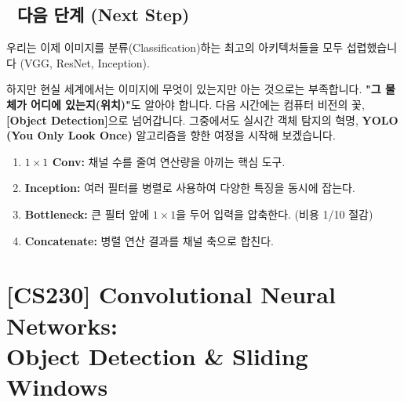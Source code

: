 \documentclass[11pt,a4paper]{book}
\theoremstyle{definition}
\begin{document}
\section*{🔗 다음 단계 (Next Step)}
우리는 이제 이미지를 분류(Classification)하는 최고의 아키텍처들을 모두 섭렵했습니다 (VGG, ResNet, Inception).

하지만 현실 세계에서는 이미지에 무엇이 있는지만 아는 것으로는 부족합니다. \textbf{"그 물체가 어디에 있는지(위치)"}도 알아야 합니다.
다음 시간에는 컴퓨터 비전의 꽃, \textbf{[Object Detection]}으로 넘어갑니다. 그중에서도 실시간 객체 탐지의 혁명, \textbf{YOLO (You Only Look Once)} 알고리즘을 향한 여정을 시작해 보겠습니다.

\vspace{0.5cm}

\begin{summarybox}[title={단원 요약 (Cheat Sheet)}]
\begin{enumerate}
    \item \textbf{$1 \times 1$ Conv:} 채널 수를 줄여 연산량을 아끼는 핵심 도구.
    \item \textbf{Inception:} 여러 필터를 병렬로 사용하여 다양한 특징을 동시에 잡는다.
    \item \textbf{Bottleneck:} 큰 필터 앞에 $1 \times 1$을 두어 입력을 압축한다. (비용 1/10 절감)
    \item \textbf{Concatenate:} 병렬 연산 결과를 채널 축으로 합친다.
\end{enumerate}
\end{summarybox}


\chapter{[CS230] Convolutional Neural Networks: \\ Object Detection \& Sliding Windows}
\label{ch:lecture34}

\end{document}
